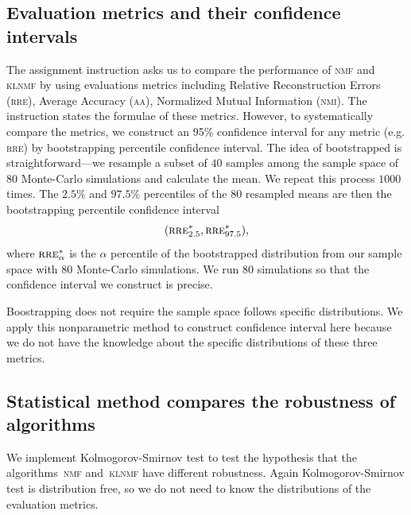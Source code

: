 \subsection{Evaluation metrics and their confidence intervals \label{ci}}
The assignment instruction asks us to compare the performance of \textsc{nmf} and \textsc{klnmf} by using evaluations metrics including Relative Reconstruction Errors (\textsc{rre}), Average Accuracy (\textsc{aa}), Normalized Mutual Information (\textsc{nmi}). The instruction states the formulae of these metrics. However, to systematically compare the metrics, we construct an 95\% confidence interval for any metric (e.g. \textsc{rre}) by bootstrapping percentile confidence interval. The idea of bootstrapped  is straightforward---we resample a subset of $40$ samples among the sample space of $80$ Monte-Carlo simulations and calculate the mean. We repeat this process $1000$ times. The $2.5\%$ and $97.5\%$ percentiles of the $80$ resampled means are then the bootstrapping percentile confidence interval
\begin{equation}
(\textsc{rre}^*_{2.5}, \textsc{rre}^*_{97.5}), \label{eq:boot}
\end{equation}
where $\textsc{rre}^*_{\alpha}$ is the $\alpha$ percentile of the bootstrapped distribution from our sample space with $80$ Monte-Carlo simulations.  We run $80$ simulations so that the confidence interval we construct is precise.

Boostrapping does not require the sample space follows specific distributions. We apply this nonparametric method to construct confidence interval here because we do not have the knowledge about the specific distributions of these three metrics.

\subsection{Statistical method compares the robustness of algorithms}
We implement Kolmogorov-Smirnov test to test the hypothesis that the algorithms~\textsc{nmf} and~\textsc{klnmf} have different robustness. Again Kolmogorov-Smirnov test is distribution free, so we do not need to know the distributions of the evaluation metrics.

